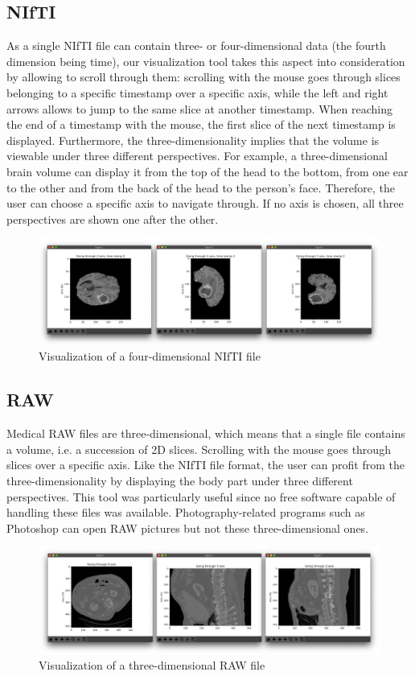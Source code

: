 \subsection{NIfTI}
As a single NIfTI file can contain three- or four-dimensional data (the fourth dimension being time), our visualization tool takes this aspect into consideration by allowing to scroll through them: scrolling with the mouse goes through slices belonging to a specific timestamp over a specific axis, while the left and right arrows allows to jump to the same slice at another timestamp. When reaching the end of a timestamp with the mouse, the first slice of the next timestamp is displayed. Furthermore, the three-dimensionality implies that the volume is viewable under three different perspectives. For example, a three-dimensional brain volume can display it from the top of the head to the bottom, from one ear to the other and from the back of the head to the person's face. Therefore, the user can choose a specific axis to navigate through. If no axis is chosen, all three perspectives are shown one after the other.

\begin{figure}[!h]
\centering
\includegraphics[width=\textwidth, keepaspectratio=true]{./figures/visualize_brain_nii.png}
\caption{Visualization of a four-dimensional NIfTI file}
\label{fig:visualize_brain_nii}
\end{figure}


\subsection{RAW}
Medical RAW files are three-dimensional, which means that a single file contains a volume, i.e. a succession of 2D slices. Scrolling with the mouse goes through slices over a specific axis. Like the NIfTI file format, the user can profit from the three-dimensionality by displaying the body part under three different perspectives. This tool was particularly useful since no free software capable of handling these files was available. Photography-related programs such as Photoshop can open RAW pictures but not these three-dimensional ones. 

\begin{figure}[!h]
\centering
\includegraphics[width=\textwidth, keepaspectratio=true]{./figures/visualize_liver_raw.png}
\caption{Visualization of a three-dimensional RAW file}
\label{fig:visualize_liver_raw}
\end{figure}
